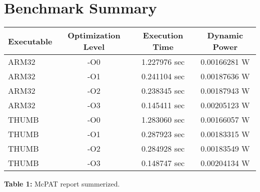 \documentclass{article}
\begin{document}
\section*{Benchmark Summary}

\begin{tabular}{|l|c|c|c|}
\hline
Executable & Optimization Level & Execution Time & Dynamic Power \\
\hline
ARM32 & -O0 & 1.227976 sec & 0.00166281 W \\
ARM32 & -O1 & 0.241104 sec & 0.00187636 W \\
ARM32 & -O2 & 0.238345 sec & 0.00187943 W \\
ARM32 & -O3 & 0.145411 sec & 0.00205123 W \\
THUMB & -O0 & 1.283060 sec & 0.00166057 W \\
THUMB & -O1 & 0.287923 sec & 0.00183315 W \\
THUMB & -O2 & 0.284928 sec & 0.00183549 W \\
THUMB & -O3 & 0.148747 sec & 0.00204134 W \\
\hline
\end{tabular}

\textbf{Table 1:} McPAT report summerized.
\end{document}
